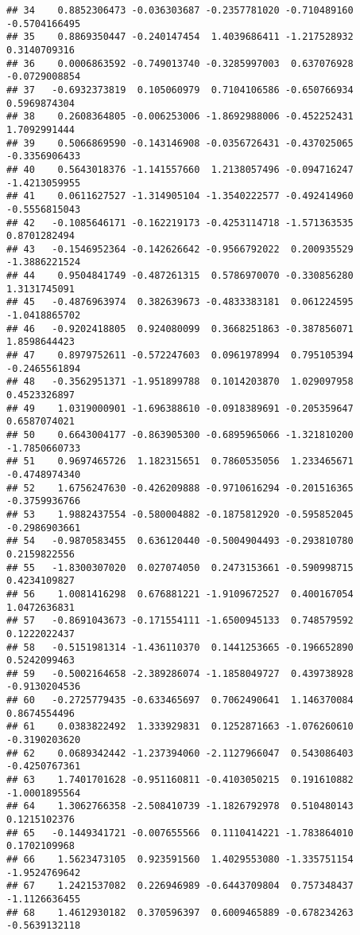 \documentclass[
]{article}
\begin{document}
\begin{verbatim}
## 34    0.8852306473 -0.036303687 -0.2357781020 -0.710489160 -0.5704166495
## 35    0.8869350447 -0.240147454  1.4039686411 -1.217528932  0.3140709316
## 36    0.0006863592 -0.749013740 -0.3285997003  0.637076928 -0.0729008854
## 37   -0.6932373819  0.105060979  0.7104106586 -0.650766934  0.5969874304
## 38    0.2608364805 -0.006253006 -1.8692988006 -0.452252431  1.7092991444
## 39    0.5066869590 -0.143146908 -0.0356726431 -0.437025065 -0.3356906433
## 40    0.5643018376 -1.141557660  1.2138057496 -0.094716247 -1.4213059955
## 41    0.0611627527 -1.314905104 -1.3540222577 -0.492414960 -0.5556815043
## 42   -0.1085646171 -0.162219173 -0.4253114718 -1.571363535  0.8701282494
## 43   -0.1546952364 -0.142626642 -0.9566792022  0.200935529 -1.3886221524
## 44    0.9504841749 -0.487261315  0.5786970070 -0.330856280  1.3131745091
## 45   -0.4876963974  0.382639673 -0.4833383181  0.061224595 -1.0418865702
## 46   -0.9202418805  0.924080099  0.3668251863 -0.387856071  1.8598644423
## 47    0.8979752611 -0.572247603  0.0961978994  0.795105394 -0.2465561894
## 48   -0.3562951371 -1.951899788  0.1014203870  1.029097958  0.4523326897
## 49    1.0319000901 -1.696388610 -0.0918389691 -0.205359647  0.6587074021
## 50    0.6643004177 -0.863905300 -0.6895965066 -1.321810200 -1.7850660733
## 51    0.9697465726  1.182315651  0.7860535056  1.233465671 -0.4748974340
## 52    1.6756247630 -0.426209888 -0.9710616294 -0.201516365 -0.3759936766
## 53    1.9882437554 -0.580004882 -0.1875812920 -0.595852045 -0.2986903661
## 54   -0.9870583455  0.636120440 -0.5004904493 -0.293810780  0.2159822556
## 55   -1.8300307020  0.027074050  0.2473153661 -0.590998715  0.4234109827
## 56    1.0081416298  0.676881221 -1.9109672527  0.400167054  1.0472636831
## 57   -0.8691043673 -0.171554111 -1.6500945133  0.748579592  0.1222022437
## 58   -0.5151981314 -1.436110370  0.1441253665 -0.196652890  0.5242099463
## 59   -0.5002164658 -2.389286074 -1.1858049727  0.439738928 -0.9130204536
## 60   -0.2725779435 -0.633465697  0.7062490641  1.146370084  0.8674554496
## 61    0.0383822492  1.333929831  0.1252871663 -1.076260610 -0.3190203620
## 62    0.0689342442 -1.237394060 -2.1127966047  0.543086403 -0.4250767361
## 63    1.7401701628 -0.951160811 -0.4103050215  0.191610882 -1.0001895564
## 64    1.3062766358 -2.508410739 -1.1826792978  0.510480143  0.1215102376
## 65   -0.1449341721 -0.007655566  0.1110414221 -1.783864010  0.1702109968
## 66    1.5623473105  0.923591560  1.4029553080 -1.335751154 -1.9524769642
## 67    1.2421537082  0.226946989 -0.6443709804  0.757348437 -1.1126636455
## 68    1.4612930182  0.370596397  0.6009465889 -0.678234263 -0.5639132118

\end{verbatim}
\end{document}
